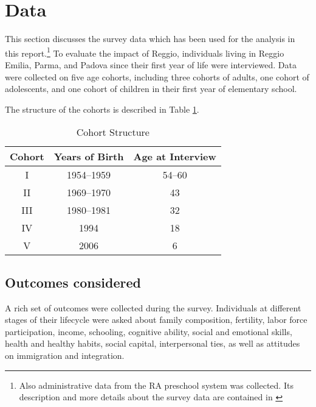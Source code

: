 \section{Data}
\label{sec:data}

This section discusses the survey data which has been used for the analysis in this report.\footnote{Also administrative data from the RA preschool system was collected. Its description and more details about the survey data are contained in \citet{biroli2015evaluating}} To evaluate the impact of Reggio, individuals living in Reggio Emilia, Parma, and Padova since their first year of life were interviewed. Data were collected on five age cohorts, including three cohorts of adults, one cohort of adolescents, and one cohort of children in their first year of elementary school. 

The structure of the cohorts is described in Table \ref{tab:cohorts}.

\begin{table}[htbp]
\begin{center}
\caption{Cohort Structure}\label{tab:cohorts}
\begin{tabular}{ccc}
\toprule
Cohort & Years of Birth & Age at Interview \\
\midrule
I & 1954--1959 & 54--60 \\
II & 1969--1970 & 43 \\
III & 1980--1981 & 32 \\
IV & 1994 & 18 \\
V & 2006 & 6 \\
\bottomrule  
\end{tabular}
\end{center}
\end{table}

\subsection{Outcomes considered}\label{sec:outcomes}
A rich set of outcomes were collected during the survey. Individuals at different stages of their lifecycle were asked about family composition, fertility, labor force participation, income, schooling, cognitive ability, social and emotional skills, health and healthy habits, social capital, interpersonal ties, as well as attitudes on immigration and integration. 

